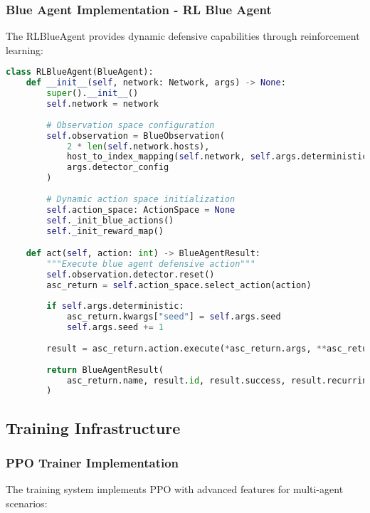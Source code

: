 \documentclass[12pt,a4paper]{article}
\begin{document}
\subsubsection{Blue Agent Implementation - RL Blue Agent}

The RLBlueAgent provides dynamic defensive capabilities through reinforcement learning:

\begin{lstlisting}[language=Python, caption=RL Blue Agent Implementation]
class RLBlueAgent(BlueAgent):
    def __init__(self, network: Network, args) -> None:
        super().__init__()
        self.network = network
        
        # Observation space configuration
        self.observation = BlueObservation(
            2 * len(self.network.hosts), 
            host_to_index_mapping(self.network, self.args.deterministic), 
            args.detector_config
        )
        
        # Dynamic action space initialization
        self.action_space: ActionSpace = None
        self._init_blue_actions()
        self._init_reward_map()

    def act(self, action: int) -> BlueAgentResult:
        """Execute blue agent defensive action"""
        self.observation.detector.reset()
        asc_return = self.action_space.select_action(action)
        
        if self.args.deterministic:
            asc_return.kwargs["seed"] = self.args.seed
            self.args.seed += 1
        
        result = asc_return.action.execute(*asc_return.args, **asc_return.kwargs)
        
        return BlueAgentResult(
            asc_return.name, result.id, result.success, result.recurring, target=result.target
        )
\end{lstlisting}

\subsection{Training Infrastructure}

\subsubsection{PPO Trainer Implementation}

The training system implements PPO with advanced features for multi-agent scenarios:
\end{document}
